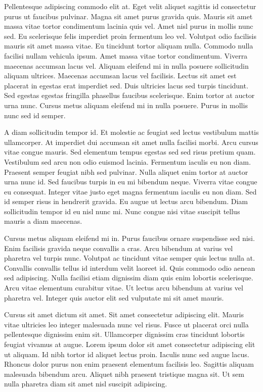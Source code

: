 \documentclass[11pt,a4paper]{article}
\begin{document}
Pellentesque adipiscing commodo elit at. Eget velit aliquet sagittis id consectetur purus ut faucibus pulvinar. Magna sit amet purus gravida quis. Mauris sit amet massa vitae tortor condimentum lacinia quis vel. Amet nisl purus in mollis nunc sed. Eu scelerisque felis imperdiet proin fermentum leo vel. Volutpat odio facilisis mauris sit amet massa vitae. Eu tincidunt tortor aliquam nulla. Commodo nulla facilisi nullam vehicula ipsum. Amet massa vitae tortor condimentum. Viverra maecenas accumsan lacus vel. Aliquam eleifend mi in nulla posuere sollicitudin aliquam ultrices. Maecenas accumsan lacus vel facilisis. Lectus sit amet est placerat in egestas erat imperdiet sed. Duis ultricies lacus sed turpis tincidunt. Sed egestas egestas fringilla phasellus faucibus scelerisque. Enim tortor at auctor urna nunc. Cursus metus aliquam eleifend mi in nulla posuere. Purus in mollis nunc sed id semper.

A diam sollicitudin tempor id. Et molestie ac feugiat sed lectus vestibulum mattis ullamcorper. At imperdiet dui accumsan sit amet nulla facilisi morbi. Arcu cursus vitae congue mauris. Sed elementum tempus egestas sed sed risus pretium quam. Vestibulum sed arcu non odio euismod lacinia. Fermentum iaculis eu non diam. Praesent semper feugiat nibh sed pulvinar. Nulla aliquet enim tortor at auctor urna nunc id. Sed faucibus turpis in eu mi bibendum neque. Viverra vitae congue eu consequat. Integer vitae justo eget magna fermentum iaculis eu non diam. Sed id semper risus in hendrerit gravida. Eu augue ut lectus arcu bibendum. Diam sollicitudin tempor id eu nisl nunc mi. Nunc congue nisi vitae suscipit tellus mauris a diam maecenas.

Cursus metus aliquam eleifend mi in. Purus faucibus ornare suspendisse sed nisi. Enim facilisis gravida neque convallis a cras. Arcu bibendum at varius vel pharetra vel turpis nunc. Volutpat ac tincidunt vitae semper quis lectus nulla at. Convallis convallis tellus id interdum velit laoreet id. Quis commodo odio aenean sed adipiscing. Nulla facilisi etiam dignissim diam quis enim lobortis scelerisque. Arcu vitae elementum curabitur vitae. Ut lectus arcu bibendum at varius vel pharetra vel. Integer quis auctor elit sed vulputate mi sit amet mauris.

Cursus sit amet dictum sit amet. Sit amet consectetur adipiscing elit. Mauris vitae ultricies leo integer malesuada nunc vel risus. Fusce ut placerat orci nulla pellentesque dignissim enim sit. Ullamcorper dignissim cras tincidunt lobortis feugiat vivamus at augue. Lorem ipsum dolor sit amet consectetur adipiscing elit ut aliquam. Id nibh tortor id aliquet lectus proin. Iaculis nunc sed augue lacus. Rhoncus dolor purus non enim praesent elementum facilisis leo. Sagittis aliquam malesuada bibendum arcu. Aliquet nibh praesent tristique magna sit. Ut sem nulla pharetra diam sit amet nisl suscipit adipiscing.
\end{document}
